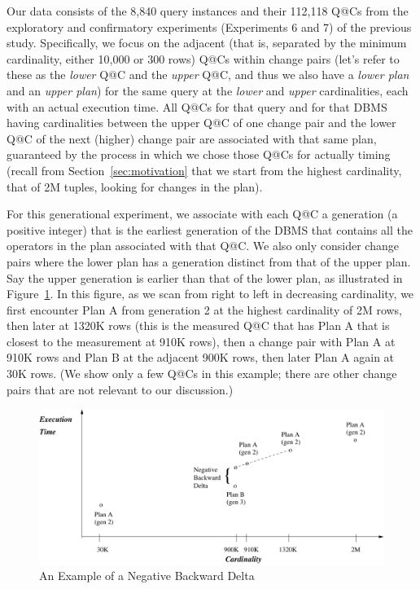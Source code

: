 \documentclass[prodmode,acmtods]{acmsmall}
\begin{document}
Our data consists of the 8,840 query instances and their 112,118 Q@Cs from
the exploratory and confirmatory experiments (Experiments 6 and 7) of
the previous study. Specifically, we focus on the adjacent (that is,
separated by the minimum cardinality, either 10,000 or 300 rows) Q@Cs within
change pairs 
(let's refer to these as the {\em lower} Q@C and the {\em upper} Q@C,
and thus we also have a {\em lower plan} and an {\em upper plan}) for the
same query at the {\em lower} and {\em upper} cardinalities, each with an actual execution time. All Q@Cs for that query and
for that DBMS having cardinalities between the upper Q@C of one change pair and the
lower Q@C of the next (higher) change pair are associated with that same plan,
guaranteed by the process in which we chose those Q@Cs for
actually timing (recall from Section~\ref{sec:motivation} that we start from
the highest cardinality, that of 2M tuples, looking for changes in the
plan).

For this generational experiment, we associate with each Q@C a generation
(a positive integer) that
is the earliest generation of the DBMS that contains all the operators in the
plan associated with that Q@C. We also only consider change pairs where the lower
plan has a generation distinct from that of the upper plan.  Say the upper
generation is earlier than that of the lower plan, as illustrated in
Figure~\ref{fig:negback}. In this figure, as we scan from right to left in
decreasing cardinality, we first encounter Plan A from generation 2 at the
highest cardinality of 2M rows, then later at 1320K rows (this is the
measured Q@C that has Plan A that is closest to the measurement at 910K
rows), then a change pair with Plan A at 910K rows and Plan B at the
adjacent 900K rows, then later Plan A again at 30K rows. (We show only a few
Q@Cs in this example; there are other change pairs that are not relevant to
our discussion.) 

\begin{figure}[t]
\includegraphics[width=30pc]{figures/negback.pdf}
\caption{An Example of a Negative Backward Delta\label{fig:negback}}
\end{figure}
\end{document}
